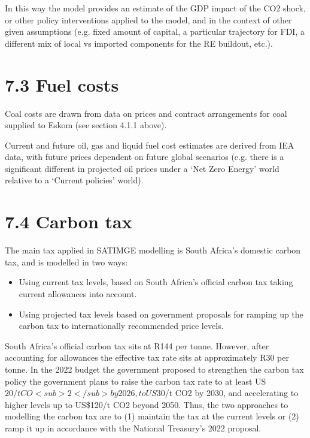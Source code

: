 \documentclass[letterpaper,10pt,english]{jupyterBook}
\begin{document}
\sphinxAtStartPar
In this way the model provides an estimate of the GDP impact of the CO2 shock, or other policy interventions applied to the model, and in the context of other given assumptions (e.g. fixed amount of capital, a particular trajectory for FDI, a different mix of local vs imported components for the RE build\sphinxhyphen{}out, etc.).


\section{7.3 Fuel costs}
\label{\detokenize{07Keyassumptions:fuel-costs}}
\sphinxAtStartPar
Coal costs are drawn from data on prices and contract arrangements for coal supplied to Eskom (see section 4.1.1 above).

\sphinxAtStartPar
Current and future oil, gas and liquid fuel cost estimates are derived from IEA data, with future prices dependent on future global scenarios (e.g. there is a significant different in projected oil prices under a ‘Net Zero Energy’ world relative to a ‘Current policies’ world).


\section{7.4 Carbon tax}
\label{\detokenize{07Keyassumptions:carbon-tax}}
\sphinxAtStartPar
The main tax applied in SATIMGE modelling is South Africa’s domestic carbon tax, and is modelled in two ways:
\begin{itemize}
\item {} 
\sphinxAtStartPar
Using current tax levels, based on South Africa’s official carbon tax taking current allowances into account.

\item {} 
\sphinxAtStartPar
Using projected tax levels based on government proposals for ramping up the carbon tax to internationally recommended price levels.

\end{itemize}

\sphinxAtStartPar
South Africa’s official carbon tax sits at R144 per tonne. However, after accounting for allowances the effective tax rate sits at approximately R30 per tonne. In the 2022 budget the government proposed to strengthen the carbon tax policy the government plans to raise the carbon tax rate to at least US\(20/t CO<sub>2</sub> by 2026, to US\)30/t CO2 by 2030, and accelerating to higher levels up to US\$120/t CO2 beyond 2050. Thus, the two approaches to modelling the carbon tax are to (1) maintain the tax at the current levels or (2) ramp it up in accordance with the National Treasury’s 2022 proposal.
\end{document}
